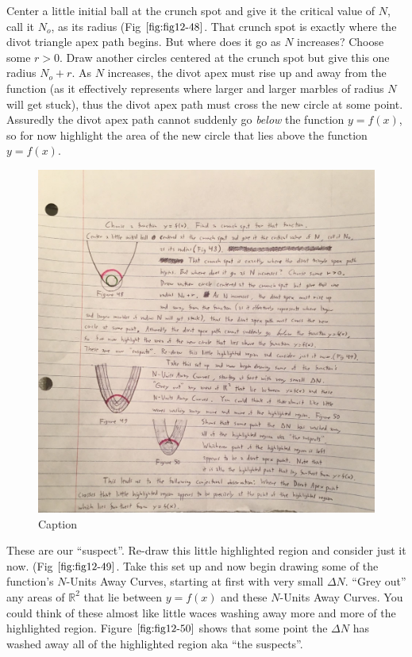 Center a little initial ball at the crunch spot and give it the critical value of $N$, call it $N_o$, as its radius (Fig $\ref{fig:fig12-48}$. That crunch spot is exactly where the divot triangle apex path begins. But where does it go as $N$ increases? Choose some $r > 0$. Draw another circles centered at the crunch spot but give this one radius $N_o + r$. As $N$ increases, the divot apex must rise up and away from the function (as it effectively represents where larger and larger marbles of radius $N$ will get stuck), thus the divot apex path must cross the new circle at some point. Assuredly the divot apex path cannot suddenly go \textit{below} the function $y = f(x)$, so for now highlight the area of the new circle that lies above the function $y = f(x)$.

\begin{figure}
  \includegraphics[width=.9\linewidth]{solving-divot-paths-img/Fig 12-49.png}
  \caption{Caption}
  \label{fig:fig12-49}
\end{figure}

These are our ``suspect''. Re-draw this little highlighted region and consider just it now. (Fig $\ref{fig:fig12-49}$. Take this set up and now begin drawing some of the function's $N$-Units Away Curves, starting at first with very small $ \Delta N$. ``Grey out'' any areas of $\mathbb{R} ^ 2$ that lie between $y = f(x)$ and these $N$-Units Away Curves. You could think of these almost like little waces washing away more and more of the highlighted region. Figure $\ref{fig:fig12-50}$ shows that some point the $\Delta N$ has washed away all of the highlighted region aka ``the suspects''. 

